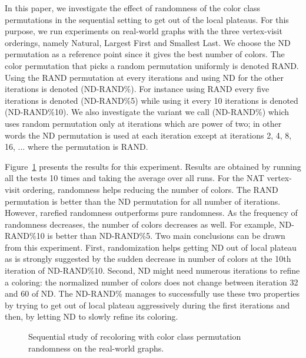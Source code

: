 \documentclass{article}
\begin{document}
In this paper, we investigate the effect of randomness of the
color class permutations in the sequential setting to get out of the
local plateaus. For this purpose, we
run experiments on real-world graphs with the three vertex-visit orderings,
namely Natural, Largest First and Smallest Last. We choose the ND
permutation as a reference point since it gives the best number of
colors. The color permutation that picks a random permutation uniformly is denoted
RAND. Using the RAND permutation at every  iterations and using ND
for the other iterations is denoted (ND-RAND\%). For instance using RAND
every five iterations is denoted (ND-RAND\%5) while using it every 10
iterations is denoted (ND-RAND\%10). We also investigate the variant
we call (ND-RAND\%) which uses random permutation only at iterations
which are power of two; in other words the ND permutation is used at
each iteration except at iterations 2, 4, 8, 16, ... where the
permutation is RAND.

Figure~\ref{fig:random_perm} presents the results for this
experiment. Results are obtained by running all the tests 10
times and taking the average over all runs. For the NAT vertex-visit ordering, randomness
helps reducing the number of colors. The RAND permutation is better
than the ND permutation for all number of iterations. However,
rarefied randomness outperforms pure randomness. As the frequency
of randomness decreases, the number of colors decreases as
well. For example, ND-RAND\%10 is better than ND-RAND\%5. Two main
conclusions can be drawn from this experiment. First, randomization
helps getting ND out of local plateau as is strongly suggested by the
sudden decrease in number of colors at the 10th iteration of
ND-RAND\%10. Second, ND might need numerous iterations to refine a
coloring: the normalized number of colors does not change between
iteration 32 and 60 of ND. The
ND-RAND\% manages to successfully use these two properties by
trying to get out of local plateau aggressively during the first
iterations and then, by letting ND to slowly refine its coloring.

\begin{figure}[bt]
  \centering
  \caption{Sequential study of recoloring with color class permutation randomness on the real-world graphs.}
  \label{fig:random_perm}
\end{figure}
\end{document}
